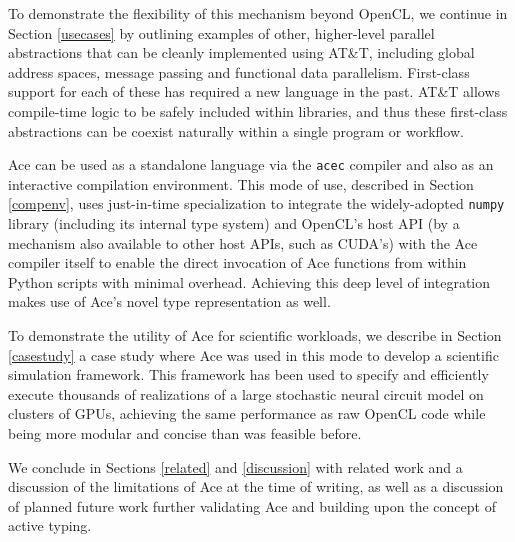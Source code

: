 \documentclass{sig-alternate}
\begin{document}
To demonstrate the flexibility of this mechanism beyond OpenCL, we continue in Section \ref{usecases} by outlining examples of other, higher-level parallel abstractions that can be cleanly implemented using AT\&T, including global address spaces, message passing and functional data parallelism. First-class support for each of these has required a new language in the past. AT\&T allows compile-time logic to be safely included within libraries, and thus these first-class abstractions can be coexist naturally within a single program or workflow.


Ace can be used as a standalone language via the \verb|acec| compiler and also as an interactive compilation environment. This mode of use, described in Section \ref{compenv}, uses just-in-time specialization to  integrate the widely-adopted \verb|numpy| library (including its internal type system) and OpenCL's host API (by a mechanism also available to other host APIs, such as CUDA's) with the Ace compiler itself to enable the direct invocation of Ace functions from within Python scripts with minimal overhead. Achieving this deep level of integration makes use of Ace's novel type representation as well.
 
To demonstrate the utility of Ace for scientific workloads, we describe in Section \ref{casestudy} a case study where Ace was used in this mode to develop a scientific simulation framework. This framework has been used to  specify and efficiently execute thousands of realizations of a large stochastic neural circuit model on clusters of GPUs, achieving the same performance as raw OpenCL code while being more modular and concise than was feasible before.

We conclude in Sections \ref{related} and \ref{discussion} with related work and a discussion of the limitations of Ace at the time of writing, as well as a discussion of planned future work further validating Ace and building upon the concept of active typing.

\end{document}

